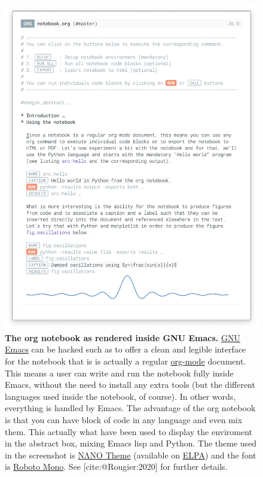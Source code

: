 \documentclass[11pt]{article}
\begin{document}
\begin{sidefig}
\begin{figure}[htbp]
\centering
\includegraphics[width=.9\linewidth]{notebook.png}
\caption{\label{fig:teaser}\textbf{The org notebook as rendered inside GNU Emacs.} \href{https://www.gnu.org/software/emacs/}{GNU Emacs} can be hacked such as to offer a clean and legible interface for the notebook that is is actually a regular \href{https://orgmode.org/}{org-mode} document. This means a user can write and run the notebook fully inside Emacs, without the need to install any extra tools (but the different languages used inside the notebook, of course). In other words, everything is handled by Emacs. The advantage of the org notebook is that you can have block of code in any language and even mix them. This actually what have been used to display the enviroment in the abstract box, mixing Emacs lisp and Python. The theme used in the screenshot is \href{https://github.com/rougier/nano-theme}{NΛNO Theme} (available on \href{https://elpa.gnu.org/}{ELPA}) and the font is \href{https://fonts.google.com/specimen/Roboto+Mono}{Roboto Mono}. See [cite:@Rougier:2020] for further details.}
\end{figure}
\end{sidefig}
\end{document}

